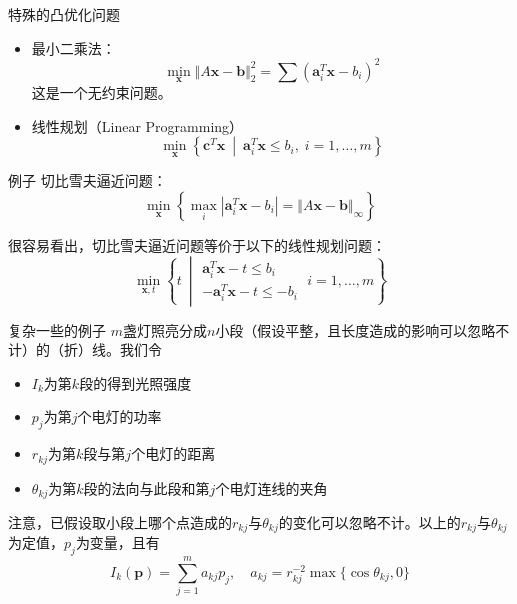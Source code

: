 
\begin{frame}

\begin{block}{特殊的凸优化问题}
\begin{itemize}
\item 最小二乘法：
$$\min\limits_{\mathbf{x}} \Vert A\mathbf{x} - \mathbf{b} \Vert_2^2 = \sum (\mathbf{a}_i^T\mathbf{x} - b_i)^2$$
这是一个无约束问题。
\item 线性规划（Linear Programming）
$$\min\limits_{\mathbf{x}} \left\{ \mathbf{c}^T\mathbf{x} \ \middle|\ \mathbf{a}_i^T\mathbf{x} \le b_i, \; i = 1,\ldots,m \right\}$$
\end{itemize}
\end{block}

\end{frame}


\begin{frame}

\begin{block}{例子}
切比雪夫逼近问题：
$$\min\limits_{\mathbf{x}} \left\{ \max\limits_i |\mathbf{a}_i^T\mathbf{x}-b_i| = \Vert A\mathbf{x} - \mathbf{b} \Vert_{\infty} \right\}$$

\vspace{1em}
\pause

很容易看出，切比雪夫逼近问题等价于以下的线性规划问题：
$$\min\limits_{\mathbf{x},t} \left\{ t \ \middle| \begin{array}{c}
\mathbf{a}_i^T\mathbf{x} - t \le b_i \\
-\mathbf{a}_i^T\mathbf{x} - t \le -b_i
\end{array}\; i = 1,\ldots,m \right\}$$
\end{block}

\end{frame}


\begin{frame}

\begin{block}{复杂一些的例子}
$m$盏灯照亮分成$n$小段（假设平整，且长度造成的影响可以忽略不计）的（折）线。我们令
\begin{itemize}
\item $I_k$为第$k$段的得到光照强度
\item $p_j$为第$j$个电灯的功率
\item $r_{kj}$为第$k$段与第$j$个电灯的距离
\item $\theta_{kj}$为第$k$段的法向与此段和第$j$个电灯连线的夹角
\end{itemize}
注意，已假设取小段上哪个点造成的$r_{kj}$与$\theta_{kj}$的变化可以忽略不计。以上的$r_{kj}$与$\theta_{kj}$为定值，$p_j$为变量，且有
$$I_k(\mathbf{p}) = \sum\limits_{j=1}^m a_{kj} p_j, \quad a_{kj} = r_{kj}^{-2} \max \{ \cos \theta_{kj}, 0 \}$$
\end{block}

\end{frame}

